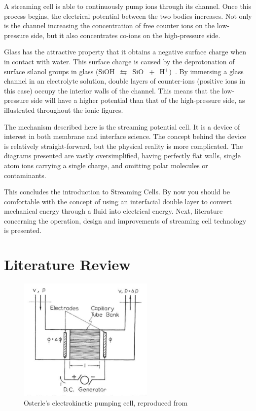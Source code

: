   A streaming cell is able to continuously pump ions through its channel.
  Once this process begins, the electrical potential between the two bodies increases.
  Not only is the channel increasing the concentration of free counter ions on the low-pressure side, but it also concentrates co-ions on the high-pressure side.

  Glass has the attractive property that it obtains a negative surface charge when in contact with water.
  This surface charge is caused by the deprotonation of surface silanol groups in glass (SiOH~$\leftrightarrows$~SiO$^{-}+$~H$^{+}$)~\cite{Kirby2004}.
  By immersing a glass channel in an electrolyte solution, double layers of counter-ions (positive ions in this case) occupy the interior walls of the channel.
  This means that the low-pressure side will have a higher potential than that of the high-pressure side, as illustrated throughout the ionic figures.

  The mechanism described here is the streaming potential cell.
  It is a device of interest in both membrane and interface science.
  The concept behind the device is relatively straight-forward, but the physical reality is more complicated.
  The diagrams presented are vastly oversimplified, having perfectly flat walls, single atom ions carrying a single charge, and omitting polar molecules or contaminants.

  This concludes the introduction to Streaming Cells.
  By now you should be comfortable with the concept of using an interfacial double layer to convert mechanical energy through a fluid into electrical energy.
  Next, literature concerning the operation, design and improvements of streaming cell technology is presented.

\section{Literature Review}

  \begin{figure}
    \centering
    \includegraphics[height=6cm]{content/pt1/Osterle_ElectrokineticCell.png}
    \caption{\label{fig:Osterle_cell}Osterle's electrokinetic pumping cell, reproduced from \cite{Osterle1964}}
  \end{figure}

